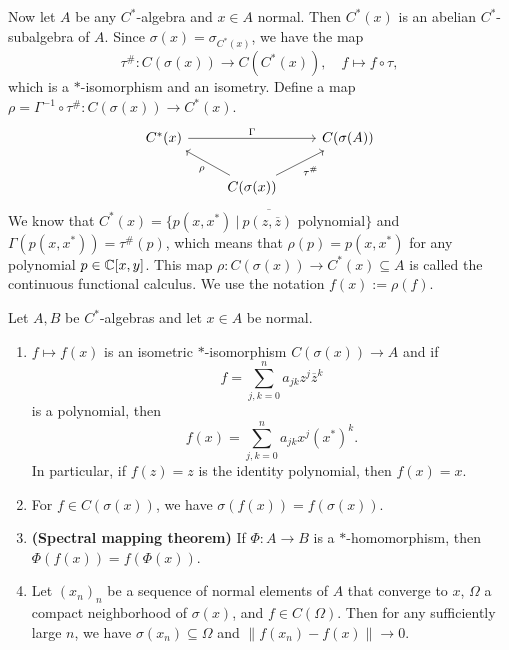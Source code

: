Now let $A$ be any $C^*$-algebra and $x \in A$ normal. 
Then $C^* (x)$ is an abelian $C^*$-subalgebra of $A$. Since $\sigma (x) = \sigma_{C^* (x)}$, we have the map 
$$\tau^{\#}: C(\sigma (x)) \to C(C^* (x)),\quad f \mapsto f \circ \tau,$$
which is a $*$-isomorphism and an isometry. Define a map $\rho = \Gamma^{-1} \circ \tau^{\#}: C(\sigma(x)) \to C^*(x)$.
\[\begin{tikzcd}
	{C^*(x)} && {C(\sigma(A))} \\
	& {C(\sigma(x))}
	\arrow["{\tau^{\#}}"', from=2-2, to=1-3]
	\arrow["\rho", from=2-2, to=1-1]
	\arrow["\Gamma", from=1-1, to=1-3]
\end{tikzcd}\]
We know that $C^*(x) = \overline{\{p(x, x^*)\ |\ \textrm{$p (z, \overline{z})$ polynomial}\}}$
and $\Gamma (p(x, x^*)) = \tau^{\#} (p)$, which means that $\rho (p) = p(x, x^*)$ for any polynomial $p \in \mathbb {C}[x, y]$.
This map $\rho: C(\sigma(x)) \to C^*(x) \subseteq A$ is called the continuous functional calculus.
We use the notation $f(x) := \rho(f)$. 

\begin{theorem}
  Let $A, B$ be $C^*$-algebras and let $x \in A$ be normal.
  \begin{enumerate}
    \item $f \mapsto f(x)$ is an isometric $*$-isomorphism $C(\sigma(x)) \to A$ and if 
    $$f = \sum_{j, k = 0} ^n a_{jk} z^j \overline{z}^k$$ is a polynomial, then 
    $$f(x) = \sum_{j, k = 0} ^n a_{jk} x^j (x^*)^k.$$
    In particular, if $f(z) = z$ is the identity polynomial, then $f(x) = x$.
    \item For $f \in C(\sigma(x))$, we have $\sigma(f(x)) = f(\sigma(x))$.
    \item \textbf{(Spectral mapping theorem)} If $\Phi: A \to B$ is a $*$-homomorphism, then $\Phi(f(x)) = f(\Phi(x))$.
    \item Let $(x_n)_n$ be a sequence of normal elements of $A$ that converge to $x$,
    $\Omega$ a compact neighborhood of $\sigma(x)$, and $f \in C(\Omega)$. Then for any
    sufficiently large $n$, we have $\sigma(x_n) \subseteq \Omega$ and $\|f(x_n) - f(x)\| \to 0$.
  \end{enumerate}
\end{theorem}

